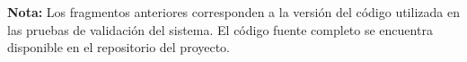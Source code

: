 \vspace{1cm}

\textbf{Nota:} Los fragmentos anteriores corresponden a la versión del código utilizada en las pruebas de validación del sistema. El código fuente completo se encuentra disponible en el repositorio del proyecto.










